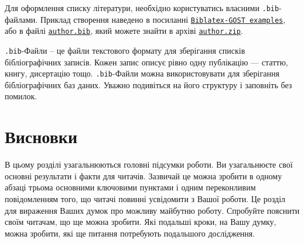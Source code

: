 \documentclass[]{iptconf}
\def\templateurl{%
\href{https://drive.google.com/file/d/1YrrTXnwaIcydBJLFS5BM6uj-yosnkRl3/view}%
{\texttt{author.zip}}}
\begin{document}
Для оформлення списку літератури, необхідно користуватись власними \texttt{.bib}-файлами. Приклад створення наведено в посиланні \href{https://ctan.math.illinois.edu/macros/latex/contrib/biblatex-contrib/biblatex-gost/doc/biblatex-gost-examples.pdf}{\texttt{Biblatex-GOST examples}}, або в файлі \href{run:author.bib}{\texttt{author.bib}}, який можете знайти в архіві \templateurl.

\texttt{.bib}-Файли -- це файли текстового формату для зберігання списків бібліографічних записів. Кожен запис описує рівно одну публікацію --- статтю, книгу, дисертацію тощо. \texttt{.bib}-Файли можна використовувати для зберігання бібліографічних баз даних. Уважно подивіться на його структуру і заповніть без помилок.







\section*{Висновки}





В цьому розділі узагальнюються головні підсумки роботи. Ви узагальнюєте свої основні результати і факти для читачів. Зазвичай це можна зробити в одному абзаці трьома основними ключовими пунктами і одним переконливим повідомленням того, що читачі повинні усвідомити з Вашої роботи. Це розділ для вираження Ваших думок про можливу майбутню роботу. Спробуйте пояснити своїм читачам, що ще можна зробити. Які подальші кроки, на Вашу думку, можна зробити, які ще питання потребують подальшого дослідження.
\end{document}
